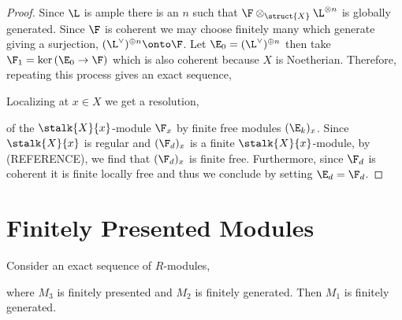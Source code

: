 \documentclass[12pt]{article}
\begin{document}
\begin{proof}
Since $\L$ is ample there is an $n$ such that $\F \otimes_{\struct{X}} \L^{\otimes n}$ is globally generated. Since $\F$ is coherent we may choose finitely many which generate giving a surjection, $(\L^\vee)^{\oplus n} \onto \F$. Let $\E_0 = (\L^\vee)^{\oplus n}$ then take $\F_1 = \ker{(\E_0 \to \F)}$ which is also coherent because $X$ is Noetherian. Therefore, repeating this process gives an exact sequence,
\begin{center}
\end{center}
Localizing at $x \in X$ we get a resolution,
\begin{center}
\end{center}
of the $\stalk{X}{x}$-module $\F_x$ by finite free modules $(\E_k)_x$. Since $\stalk{X}{x}$ is regular and $(\F_d)_x$ is a finite $\stalk{X}{x}$-module, by (REFERENCE), we find that $(\F_d)_x$ is finite free. Furthermore, since $\F_d$ is coherent it is finite locally free and thus we conclude by setting $\E_d = \F_d$.
\end{proof}

\section{Finitely Presented Modules}

\begin{prop}
Consider an exact sequence of $R$-modules,
\begin{center}
\end{center}
where $M_3$ is finitely presented and $M_2$ is finitely generated. Then $M_1$ is finitely generated.
\end{prop}
\end{document}
